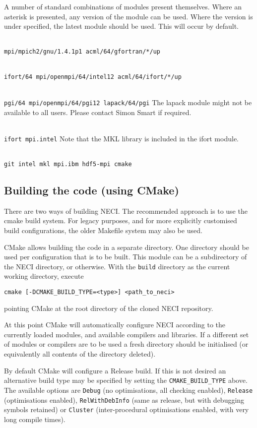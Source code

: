 \documentclass[a4paper,notitlepage,dvipsnames]{scrreprt}
\newcommand\headitem[1]{\needspace{1.5\baselineskip}\item[{\boldmath #1 \nopagebreak}] \hfill \\ \nopagebreak}
\let\code\lstinline
\begin{document}
	A number of standard combinations of modules present themselves. Where an
	asterisk is presented, any version of the module can be used. Where the
	version is under specified, the latest module should be used. This will
	occur by default.
	\begin{description}
		\headitem{gfortran (Cambridge)}
			\code{mpi/mpich2/gnu/1.4.1p1 acml/64/gfortran/*/up}
		\headitem{ifort (Cambridge)}
			\code{ifort/64 mpi/openmpi/64/intel12 acml/64/ifort/*/up}
		\headitem{PGI (Cambridge)}
			\code{pgi/64 mpi/openmpi/64/pgi12 lapack/64/pgi} \linebreak
			The lapack module might not be available to all users. Please
			contact Simon Smart if required.
		\headitem{ifort (Max Planck FKF)}
			\code{ifort mpi.intel}\linebreak
			Note that the MKL library is included in the ifort module.
		\headitem{ifort (hydra)}
			\code{git intel mkl mpi.ibm hdf5-mpi cmake}
	\end{description}

\subsection{Building the code (using CMake)}
	There are two ways of building NECI. The recommended approach is to use
	the cmake build system. For legacy purposes, and for more explicitly
	customised build configurations, the older Makefile system may also
	be used.

	CMake allows building the code in a separate directory. One directory
	should be used per configuration that is to be built. This module can
	be a subdirectory of the NECI directory, or otherwise.
	With the \code{build} directory as the current working directory,
	execute
	\begin{lstlisting}[gobble=4]
	cmake [-DCMAKE_BUILD_TYPE=<type>] <path_to_neci>
	\end{lstlisting}
	pointing CMake at the root directory of the cloned NECI repository.

	At this point CMake will automatically configure NECI according to the
	currently loaded modules, and available compilers and libraries. If a
	different set of modules or compilers are to be used a fresh directory
	should be initialised (or equivalently all contents of the directory
	deleted).

	By default CMake will configure a Release build. If this is not desired
	an alternative build type may be specified by setting the
	\code{CMAKE_BUILD_TYPE} above. The available options are \code{Debug} (no
	optimisations, all checking enabled), \code{Release} (optimisations
	enabled), \code{RelWithDebInfo} (same as release, but with debugging
	symbols retained) or \code{Cluster} (inter-procedural optimisations
	enabled, with very long compile times).
\end{document}
